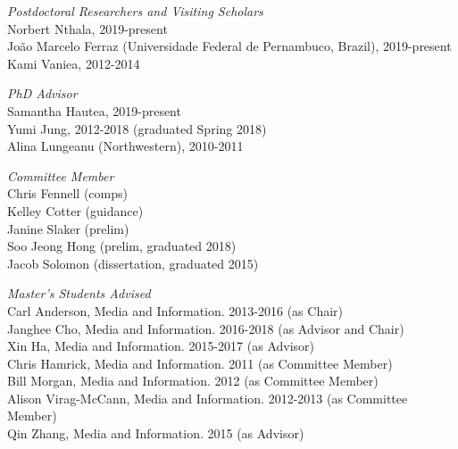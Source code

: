 \documentclass[9pt]{extarticle}
\begin{document}
\emph{Postdoctoral Researchers and Visiting Scholars} \\
\vspace{1pt}
Norbert Nthala, 2019-present \\
Jo\~ao Marcelo Ferraz (Universidade Federal de Pernambuco, Brazil), 2019-present \\
Kami Vaniea, 2012-2014

\emph{PhD Advisor} \\
\vspace{1pt}
Samantha Hautea, 2019-present \\
Yumi Jung, 2012-2018 (graduated Spring 2018) \\
Alina Lungeanu (Northwestern), 2010-2011

\emph{Committee Member} \\
\vspace{1pt}
Chris Fennell (comps) \\
Kelley Cotter (guidance) \\
Janine Slaker (prelim) \\
Soo Jeong Hong (prelim, graduated 2018) \\
Jacob Solomon (dissertation, graduated 2015)

\emph{Master's Students Advised} \\
\vspace{1pt}
Carl Anderson, Media and Information. 2013-2016 (as Chair) \\
Janghee Cho, Media and Information. 2016-2018 (as Advisor and Chair) \\
Xin Ha, Media and Information. 2015-2017 (as Advisor) \\
Chris Hamrick, Media and Information. 2011 (as Committee Member) \\
Bill Morgan, Media and Information. 2012 (as Committee Member) \\
Alison Virag-McCann, Media and Information. 2012-2013 (as Committee Member) \\
Qin Zhang, Media and Information. 2015 (as Advisor)
\end{document}
